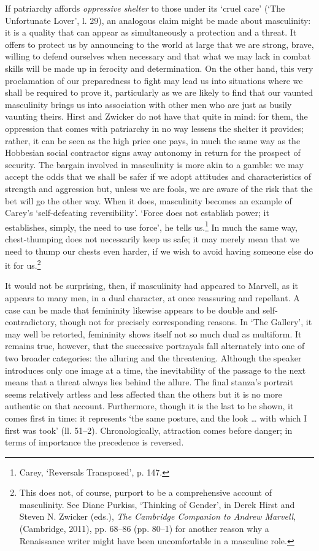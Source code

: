 ﻿\documentclass[12pt]{article}
\newcommand{\citedtitle}[1]{\textit{#1}}
\begin{document}
If
patriarchy affords \emph{oppressive shelter}
to those under its ‘cruel care’ (‘The Unfortunate Lover’, l. 29), an analogous
claim might be made about masculinity: it is a quality that can appear as
simultaneously a protection and a threat. It offers to protect us by announcing
to the world at large that we are strong, brave, willing to defend ourselves
when necessary and that what we may lack in combat skills will be made up in
ferocity and determination.
On the other hand, this very proclamation of our preparedness to fight may lead
us into situations where we shall be required to prove it, particularly as we
are likely to find that our vaunted masculinity brings us into association with
other men who are just as busily vaunting theirs. Hirst and Zwicker do not have that
quite in mind: for them, the oppression that comes with patriarchy in no way
lessens the shelter it provides; rather, it can be seen as the high price one
pays, in much the same way as the Hobbesian social contractor signs away
autonomy in return for the prospect of security. The bargain involved in
masculinity is more akin to a gamble: we may accept the odds that we shall be
safer if we adopt attitudes and characteristics of strength and aggression but,
unless we are fools, we are aware of the risk that the bet will go the other
way. When it does, masculinity becomes an example of Carey’s ‘self-defeating
reversibility’. ‘Force does not establish power; it establishes, simply, the
need to use force’, he tells us.\footnote{Carey, ‘Reversals Transposed’, p. 147.}
In much the same way, chest-thumping does not necessarily keep us safe; it may
merely mean that we need to thump our chests even harder, if we wish to avoid
having someone else do it for us.\footnote{This does not, of
course, purport to be a comprehensive account of masculinity. See Diane
Purkiss, ‘Thinking of Gender’, in Derek Hirst and Steven N. Zwicker (eds.), \citedtitle{The
Cambridge Companion to Andrew Marvell}, (Cambridge, 2011), pp. 68–86 (pp.
80–1) for another reason why a Renaissance writer might have been uncomfortable
in a masculine role.}

It
would not be surprising, then, if masculinity had appeared to Marvell, as it
appears to many men, in a dual character, at once reassuring and repellant. A
case can be made that femininity likewise appears to be double and
self-contradictory, though not for precisely corresponding reasons. In ‘The
Gallery’, it may well be retorted, femininity shows itself not so much dual as
multiform. It remains true, however, that the successive portrayals fall
alternately into one of two broader categories: the alluring and the
threatening. Although the speaker introduces only one image at a time, the
inevitability of the passage to the next means that a threat always lies behind
the allure. The final stanza’s portrait seems relatively artless and less
affected than the others but it is no more authentic on that account.
Furthermore, though it is the last to be shown, it comes first in time: it
represents ‘the same posture, and the look … with which I first was took’ (ll.
51–2). Chronologically, attraction comes before danger; in terms of importance
the precedence is reversed.
\end{document}
